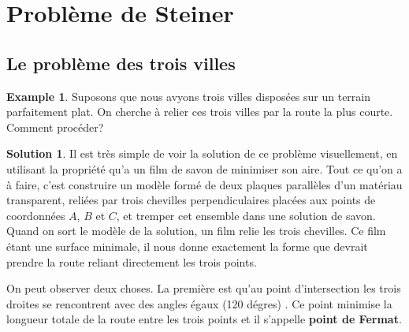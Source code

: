 \documentclass[10pt,a4paper]{article}%
\theoremstyle{theorem}
\theoremstyle{definition}
\newtheorem{example}{Example}
\newtheorem*{solution*}{Solution}
\begin{document}
	\section{Problème de Steiner}
		\subsection{Le problème des trois villes}\label{troisvilles}
		
		\begin{example}
			 Suposons que nous avyons trois villes disposées sur un terrain parfaitement plat. On cherche à relier ces trois villes par la route la plus courte. Comment procéder?
		\end{example}
		
		
		\begin{solution*}
			Il est très simple de voir la solution de ce problème visuellement, en utilisant la propriété qu'a un film de savon de minimiser son aire. Tout ce qu’on a à faire,	c’est construire un modèle formé de deux plaques parallèles d’un matériau transparent, reliées par trois chevilles perpendiculaires placées aux points de coordonnées $A$, $B$ et $C$, et tremper cet ensemble dans une solution de savon. Quand on sort le modèle de la solution, un film relie les trois chevilles. Ce film  étant une surface minimale, il nous donne exactement la forme que devrait prendre la route reliant directement les trois points. 	
			
			On peut observer deux choses. La première est qu’au point d’intersection les trois droites se rencontrent avec des angles égaux (120 dégres) . Ce point minimise la longueur totale de la route entre les trois points et il s'appelle \textbf{point de Fermat}.
			
			\begin{figure}[h]
				
			\begin{center}
			\end{center}
			\caption{}\label{ris2.figure}
			\end{figure}
			

\end{solution*}
\end{document}
